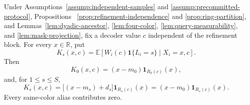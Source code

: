 \begin{proposition}
\label{prop:level-inversion}
Under Assumptions~\ref{assump:independent-samples} and
\ref{assump:precommitted-protocol}, Propositions~
\ref{prop:refinement-independence} and \ref{prop:ring-partition}, and
Lemmas~\ref{lem:dyadic-ancestor}, \ref{lem:four-color},
\ref{lem:query-measurability}, and \ref{lem:mask-projection}, fix a decoder
value $c$ independent of the refinement block.  For every $x\in\mathbb R$,
put
\[
 K_s(x,c)=\mathbb E[W_i(c)\mathbf1\{L_i=s\}\mid X_i=x,c].
\]
Then
\[
 K_0(x,c)=(x-m_0)\mathbf1_{R_0(c)}(x),
\]
and, for $1\leq s\leq S$,
\[
 K_s(x,c)=\bigl[(x-m_s)+d_s\bigr]\mathbf1_{R_s(c)}(x)
 =(x-m_0)\mathbf1_{R_s(c)}(x).
\]
Every same-color alias contributes zero.
\end{proposition}

